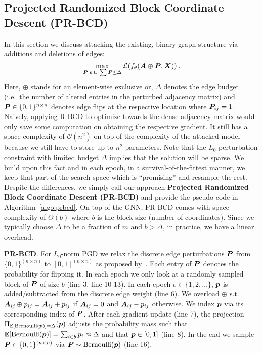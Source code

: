 \documentclass[sigconf, review]{acmart}
\newcommand{\adj}{\mA}
\newcommand{\features}{\mX}
\begin{document}
\subsection{Projected Randomized Block Coordinate Descent (PR-BCD)}\label{sec:prbcd}

In this section we discuss attacking the existing, binary graph structure via additions and deletions of edges:
%
\begin{equation}\label{eq:pgd}
  \max_{\mP\,\,\text{s.t.}\, \sum \mP \le \Delta} \mathcal{L}(f_{\theta}(\adj \oplus \mP, \features))\,.
\end{equation}
%
Here, \(\oplus\) stands for an element-wise exclusive or, \(\Delta\) denotes the edge budget (i.e.\ the number of altered entries in the perturbed adjacency matrix) and \({\bm{P}} \in \{0, 1\}^{n \times n}\) denotes edge flips at the respective location where ${\bm{P}}_{ij} = 1$. Naively, applying R-BCD to optimize towards the dense adjacency matrix would only save some computation on obtaining the respective gradient. It still has a space complexity of \(\mathcal{O}(n^2)\) on top of the complexity of the attacked model because we still have to store up to \(n^2\) parameters.
Note that the \(L_0\) perturbation constraint with limited budget \(\Delta\) implies that the solution will be sparse. We build upon this fact and in each epoch, in a survival-of-the-fittest manner, we keep that part of the search space which is ``promising'' and resample the rest. Despite the differences, we simply call our approach \textbf{Projected Randomized Block Coordinate Descent (PR-BCD)} and provide the pseudo code in Algorithm~\ref{algo:prbcd}. On top of the GNN, PR-BCD comes with space complexity of \(\Theta(b)\) where \(b\) is the block size (number of coordinates). Since we typically choose \(\Delta\) to be a fraction of \(m\) and \(b > \Delta\), in practice, we have a linear overhead.

\textbf{PR-BCD}. For \(L_0\)-norm PGD we relax the discrete edge perturbations \({\bm{P}}\) from \(\{0, 1\}^{(n \times n)}\) to \([0, 1]^{(n \times n)}\) as proposed by~\citet{Xu2019a}. Each entry of \({\bm{P}}\) denotes the probability for flipping it. In each epoch we only look at a randomly sampled block of \({\bm{P}}\) of size \(b\) (line 3, line 10-13). In each epoch \(e \in \{1,2, \dots\}\), \({\bm{p}}\) is added/subtracted from the discrete edge weight (line 6). We overload \(\oplus\) s.t.\ \(\adj_{ij} \oplus p_{ij} = \adj_{ij} + p_{ij}\) if \(\adj_{ij} = 0\) and \(\adj_{ij} - p_{ij}\) otherwise. We index \({\bm{p}}\) via its corresponding index of \({\bm{P}}\). After each gradient update (line 7), the projection \(\Pi_{\mathbb{E}[\text{Bernoulli}({\bm{p}})] = \Delta} ({\bm{p}})\) adjusts the probability mass such that \(\mathbb{E}[\text{Bernoulli}({\bm{p}})] = \sum_{i \in b} {p}_i \approx \Delta\) and that \({\bm{p}} \in [0, 1]\) (line 8). 
In the end we sample \({\bm{P}} \in \{0, 1\}^{(n \times n)}\) via \({\bm{P}} \sim \text{Bernoulli}({\bm{p}})\) (line 16).
\end{document}
